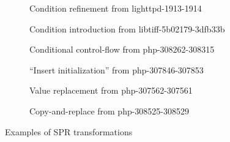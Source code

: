 \begin{figure}[t!]

\begin{subfigure}[b]{\linewidth}
    
    \vspace{-0.1in}
    \caption{Condition refinement from lighttpd-1913-1914}
\end{subfigure}

\begin{subfigure}[b]{\linewidth}
    
    \vspace{-0.1in}
    \caption{Condition introduction from libtiff-5b02179-3dfb33b}
\end{subfigure}

\begin{subfigure}[b]{\linewidth}
    
    \vspace{-0.1in}
    \caption{Conditional control-flow from php-308262-308315}
\end{subfigure}

\begin{subfigure}[b]{\linewidth}
    
    \vspace{-0.1in}
    \caption{``Insert initialization'' from php-307846-307853}
\end{subfigure}

\begin{subfigure}[b]{\linewidth}
    
    \vspace{-0.1in}
    \caption{Value replacement from php-307562-307561}
\end{subfigure}

\begin{subfigure}[b]{\linewidth}
    
    \vspace{-0.1in}
    \caption{Copy-and-replace from php-308525-308529}
\end{subfigure}

\vspace{0.1in}
\small \caption{Examples of SPR transformations}
    \label{figure:spr-repairs}
\vspace{-0.2in}
\end{figure}


